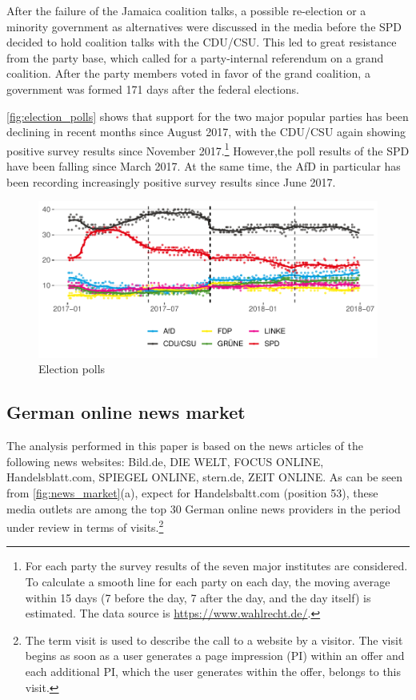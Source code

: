 \documentclass[
]{article}
\begin{document}
After the failure of the Jamaica coalition talks, a possible re-election
or a minority government as alternatives were discussed in the media
before the SPD decided to hold coalition talks with the CDU/CSU. This
led to great resistance from the party base, which called for a
party-internal referendum on a grand coalition. After the party members
voted in favor of the grand coalition, a government was formed 171 days
after the federal elections.

\autoref{fig:election_polls} shows that support for the two major
popular parties has been declining in recent months since August 2017,
with the CDU/CSU again showing positive survey results since November
2017.\footnote{For each party the survey results of the seven major
  institutes are considered. To calculate a smooth line for each party
  on each day, the moving average within 15 days (7 before the day, 7
  after the day, and the day itself) is estimated. The data source is
  \url{https://www.wahlrecht.de/}.} However,the poll results of the SPD
have been falling since March 2017. At the same time, the AfD in
particular has been recording increasingly positive survey results since
June 2017.

\begin{figure}

{\centering \includegraphics[width=0.6\linewidth]{main_text_files/figure-latex/election polls-1} 

}

\caption{Election polls \label{fig:election_polls}}\label{fig:election polls}
\end{figure}

\hypertarget{german-online-news-market}{%
\subsection{German online news market}\label{german-online-news-market}}

The analysis performed in this paper is based on the news articles of
the following news websites: Bild.de, DIE WELT, FOCUS ONLINE,
Handelsblatt.com, SPIEGEL ONLINE, stern.de, ZEIT ONLINE. As can be seen
from \autoref{fig:news_market}(a), expect for Handelsbaltt.com (position
53), these media outlets are among the top 30 German online news
providers in the period under review in terms of visits.\footnote{The
  term visit is used to describe the call to a website by a visitor. The
  visit begins as soon as a user generates a page impression (PI) within
  an offer and each additional PI, which the user generates within the
  offer, belongs to this visit.}
\end{document}
